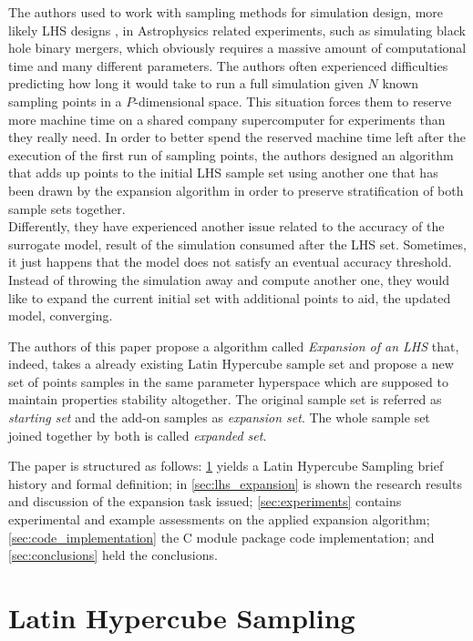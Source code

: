 \documentclass[12pt]{extarticle}
\begin{document}
The authors used to work with sampling methods for simulation design, more likely LHS designs  , in Astrophysics related experiments, such as simulating black hole binary mergers, which obviously requires a massive amount of computational time and many different parameters. The authors often experienced difficulties predicting how long it would take to run a full simulation given $N$ known sampling points in a $P$-dimensional space. This situation forces them to reserve more machine time on a shared company supercomputer for experiments than they really need. In order to better spend the reserved machine time left after the execution of the first run of sampling points, the authors designed an algorithm that adds up points to the initial LHS sample set using another one that has been drawn by the expansion algorithm in order to preserve stratification of both sample sets together.\\
Differently, they have experienced another issue related to the accuracy of the surrogate model, result of the simulation consumed after the LHS set. Sometimes, it just happens that the model does not satisfy an eventual accuracy threshold. Instead of throwing the simulation away and compute another one, they would like to expand the current initial set with additional points to aid, the updated model, converging.

The authors of this paper propose a algorithm called \textit{Expansion of an LHS} that, indeed, takes a already existing Latin Hypercube sample set and propose a new set of points samples in the same parameter hyperspace which are supposed to maintain properties stability altogether.
The original sample set is referred as \textit{starting set} and the add-on samples as \textit{expansion set}. The whole sample set joined together by both is called \textit{expanded set}.

The paper is structured as follows: \cref{sec:lhs} yields a Latin Hypercube Sampling brief history and formal definition; in \cref{sec:lhs_expansion} is shown the research results and discussion of the expansion task issued; \cref{sec:experiments} contains experimental and example assessments on the applied expansion algorithm; \cref{sec:code_implementation} the C module package code implementation; and \cref{sec:conclusions} held the conclusions.

\section{Latin Hypercube Sampling}
\label{sec:lhs}
\end{document}
